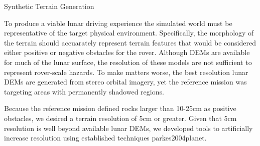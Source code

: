 \documentclass[twocolumn,letterpaper]{IEEEAerospaceCLS}  %
\begin{document}
  
  
Synthetic Terrain Generation

To produce a viable lunar driving experience the simulated world must be representative of the target physical environment. Specifically, the morphology of the terrain should accuarately represent terrain features that would be considered either positive or negative obstacles for the rover. Although DEMs are available for much of the lunar surface, the resolution of these models are not sufficient to represent rover-scale hazards. To make matters worse, the best resolution lunar DEMs are generated from stereo orbital imagery, yet the reference mission was targeting areas with permanently shadowed regions. 

Because the reference mission defined rocks larger than 10-25cm as positive obstacles, we desired a terrain resolution of 5cm or greater. Given that 5cm resolution is well beyond available lunar DEMs, we developed tools to artificially increase resolution using established techniques {parkes2004planet}. 



  
  
\end{document}
